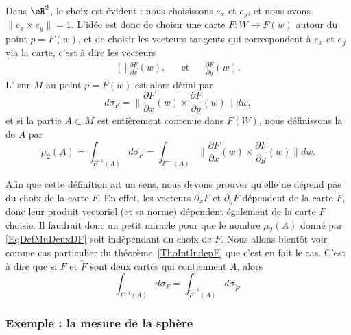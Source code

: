 Dans $\eR^2$, le choix est évident : nous choisissons $e_x$ et $e_y$, et nous avons $\|e_x\times e_y\|=1$. L'idée est donc de choisir une carte $F\colon W\to F(w)$ autour du point $p=F(w)$, et de choisir les vecteurs tangents qui correspondent à $e_x$ et $e_y$ via la carte, c'est à dire les vecteurs
\begin{equation}
	\begin{aligned}[]
		\frac{ \partial F }{ \partial x }(w),&&\text{et}&&\frac{ \partial F }{ \partial y }(w).
	\end{aligned}
\end{equation}
L' sur $M$ au point $p=F(w)$ est alors défini par
\begin{equation}
	d\sigma_F=\|  \frac{ \partial F }{ \partial x }(w)\times\frac{ \partial F }{ \partial y }(w) \|dw,
\end{equation}
et si la partie $A\subset M$ est entièrement contenue dans $F(W)$, nous définissons la  de $A$ par
\begin{equation}		\label{EqDefMuDeuxDF}
	\mu_2(A)=\int_{F^{-1}(A)}d\sigma_F=\int_{F^{-1}(A)}\| \frac{ \partial F }{ \partial x }(w)\times\frac{ \partial F }{ \partial y }(w) \|dw.
\end{equation}
\begin{remark}
	Afin que cette définition ait un sens, nous devons prouver qu'elle ne dépend pas du choix de la carte $F$. En effet, les vecteurs $\partial_xF$ et $\partial_yF$ dépendent de la carte $F$, donc leur produit vectoriel (et sa norme) dépendent également de la carte $F$ choisie. Il faudrait donc un petit miracle pour que le nombre $\mu_2(A)$ donné par \eqref{EqDefMuDeuxDF} soit indépendant du choix de $F$.  Nous allons bientôt voir comme cas particulier du théorème~\ref{ThoIntIndepF} que c'est en fait le cas. C'est à dire que si $F$ et $\tilde F$ sont deux cartes qui contiennent $A$, alors
	\begin{equation}
		\int_{F^{-1}(A)}d\sigma_F=\int_{\tilde F^{-1}(A)}d\sigma_{\tilde F}.
	\end{equation}
\end{remark}

\subsubsection{Exemple : la mesure de la sphère}

